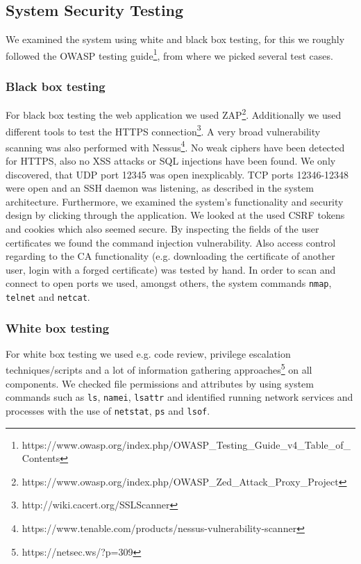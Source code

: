 \documentclass[english]{article}
\newcommand{\code}[1]{\texttt{#1}}
\begin{document}
\subsection{System Security Testing} %

We examined the system using white and black box testing, for this we roughly followed the OWASP testing guide\footnote{https://www.owasp.org/index.php/OWASP\_Testing\_Guide\_v4\_Table\_of\_Contents}, from where we picked several test cases.

\subsubsection{Black box testing}
For black box testing the web application we used ZAP\footnote{https://www.owasp.org/index.php/OWASP\_Zed\_Attack\_Proxy\_Project}. Additionally we used different tools to test the HTTPS connection\footnote{http://wiki.cacert.org/SSLScanner}. A very broad vulnerability scanning was also performed with Nessus\footnote{https://www.tenable.com/products/nessus-vulnerability-scanner}. No weak ciphers have been detected for HTTPS, also no XSS attacks or SQL injections have been found. We only discovered, that UDP port 12345 was open inexplicably. TCP ports 12346-12348 were open and an SSH daemon was listening, as described in the system architecture. Furthermore, we examined the system's functionality and security design by clicking through the application. We looked at the used CSRF tokens and cookies which also seemed secure. By inspecting the fields of the user certificates we found the command injection vulnerability. Also access control regarding to the CA functionality (e.g. downloading the certificate of another user, login with a forged certificate) was tested by hand. In order to scan and connect to open ports we used, amongst others, the system commands \code{nmap}, \code{telnet} and \code{netcat}.


\subsubsection{White box testing}
For white box testing we used e.g. code review, privilege escalation techniques/scripts and a lot of information gathering approaches\footnote{https://netsec.ws/?p=309} on all components. We checked file permissions and attributes by using system commands such as \code{ls}, \code{namei}, \code{lsattr} and identified running network services and processes with the use of \code{netstat}, \code{ps} and \code{lsof}. 
\end{document}
